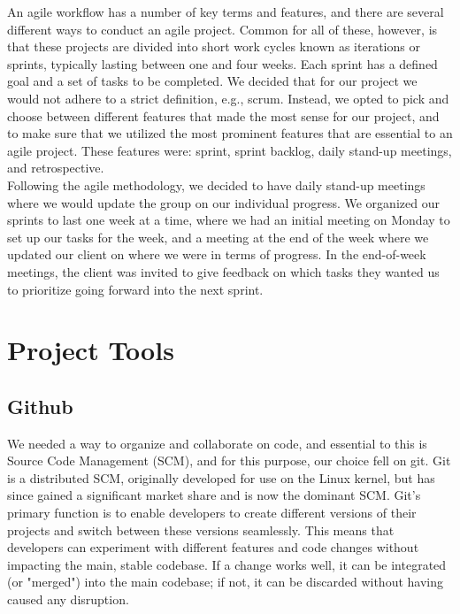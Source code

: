 An agile workflow has a number of key terms and features, and there are several different ways to conduct an agile project. Common for all of these, however, is that these projects are divided into short work cycles known as iterations or sprints, typically lasting between one and four weeks. Each sprint has a defined goal and a set of tasks to be completed. We decided that for our project we would not adhere to a strict definition, e.g., scrum. Instead, we opted to pick and choose between different features that made the most sense for our project, and to make sure that we utilized the most prominent features that are essential to an agile project. These features were: sprint, sprint backlog, daily stand-up meetings, and retrospective.\\

Following the agile methodology, we decided to have daily stand-up meetings where we would update the group on our individual progress. We organized our sprints to last one week at a time, where we had an initial meeting on Monday to set up our tasks for the week, and a meeting at the end of the week where we updated our client on where we were in terms of progress. In the end-of-week meetings, the client was invited to give feedback on which tasks they wanted us to prioritize going forward into the next sprint.\\

\section{Project Tools}

\subsection{Github}

We needed a way to organize and collaborate on code, and essential to this is Source Code Management (SCM), and for this purpose, our choice fell on git. Git is a distributed SCM, originally developed for use on the Linux kernel, but has since gained a significant market share and is now the dominant SCM. Git's primary function is to enable developers to create different versions of their projects and switch between these versions seamlessly. This means that developers can experiment with different features and code changes without impacting the main, stable codebase. If a change works well, it can be integrated (or "merged") into the main codebase; if not, it can be discarded without having caused any disruption.\\

